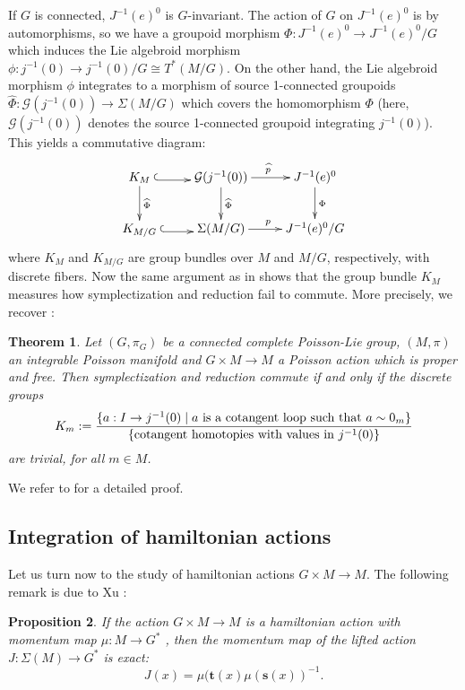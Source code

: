 \documentclass[a4paper,11pt]{amsart}
\newtheorem{thm}{Theorem}[section]
\newtheorem{prop}[thm]{Proposition}
\theoremstyle{definition}
\theoremstyle{remark}
\begin{document}
If $G$ is connected,  $J^{-1}(e)^0$ is $G$-invariant. The action of $G$ on $J^{-1}(e)^0$ is by automorphisms, so
we have a groupoid morphism $\Phi:J^{-1}(e)^0 \to J^{-1}(e)^0/G$ which induces the Lie algebroid morphism
$\phi:j^{-1}(0)\to j^{-1}(0)/G\cong T^*(M/G)$. On the other hand, the Lie algebroid morphism $\phi$ integrates
to a morphism of source 1-connected groupoids $\widehat{\Phi}: {\mathcal{G}}(j^{-1}(0)) \to \Sigma (M/G)$ which covers the
homomorphism $\Phi$ (here, ${\mathcal{G}} (j^{-1}(0))$ denotes the source 1-connected groupoid integrating $j^{-1}(0)$).
This yields a commutative diagram:
\begin{equation}
\label{eq:diag:com:symp}
\newdir{ (}{{}*!/-5pt/@^{(}}
\xymatrix{
K_M\ar[d]^{\widehat{\Phi}}\ar@<-2pt>@{ (->}[r]& {\mathcal{G}}(j^{-1}(0))\ar[d]^{\widehat{\Phi}}\ar[r]^{\widehat{p}}& J^{-1}(e)^0\ar[d]^{\Phi}\\
K_{M/G}\ar@<-2pt>@{ (->}[r]& \Sigma (M/G)\ar[r]^p& J^{-1}(e)^0/G}
\end{equation}
where $K_M$ and $K_{M/G}$ are group bundles over $M$ and $M/G$, respectively, with discrete fibers. Now the same
argument as in \cite{FerOrRa} shows that the group bundle $K_M$ measures how symplectization and reduction fail
to commute. More precisely, we recover \cite[Proposition 5.3]{Ste}:

\begin{thm}
\label{thm:int:reduct:alt} Let $(G,\pi_G)$ be a connected complete
Poisson-Lie group, $(M,\pi)$ an integrable Poisson manifold and
$G\times M\to M$ a Poisson action which is proper and free. Then
symplectization and reduction commute if and only if the discrete
groups
\[
  K_{m}:=\frac{\{a:I\to j^{-1}(0) \mid a \text{\rm ~is a cotangent loop such that }a\sim 0_m\}}
   {\{\text{\rm cotangent homotopies with values in } j^{-1}(0)\}}
\]
are trivial, for all $m\in M$.
\end{thm}

We refer to \cite{FerOrRa} for a detailed proof.

\subsection{Integration of hamiltonian actions}                \label{subsec:int:hamiltonian}                                 
Let us turn now to the study of hamiltonian actions $G\times M\to
M$. The following remark is due to Xu \cite{Xu0}:

\begin{prop}
If the action $G\times M\to M$ is a hamiltonian action with momentum map $\mu:M\to G^*$ , then the momentum map
of the lifted action $J:\Sigma(M)\to G^*$ is exact:
\[ J(x)=\mu({\mathbf{t}}(x)\mu({\mathbf{s}}(x))^{-1}. \]
\end{prop}
\end{document}
